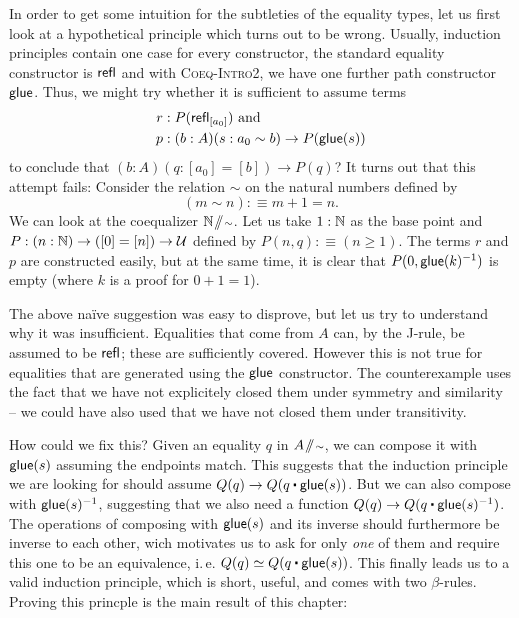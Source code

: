 In order to get some intuition for the subtleties of the equality types,
let us first look at a hypothetical principle which turns out to be wrong.
Usually, induction principles contain one case for every constructor,
the standard equality constructor is $\mathsf{refl}$ and with \textsc{Coeq-Intro2}, we
have one further path constructor $\mathsf{glue}$.
Thus, we might try whether it is sufficient to assume terms
\begin{align*}
r &: P(\mathsf{refl}_{[a_0]}) \text{ and}\\
p &: (b : A)(s : a_0 \sim b) \to P(\mathsf{glue}(s))
\end{align*}
to conclude that $(b : A)(q : [a_0] = [b]) \to P(q)$?
It turns out that this attempt fails:
Consider the relation $\sim$ on the natural numbers defined by
\begin{equation*}
(m \sim n) :\equiv m + 1 = n \text{.}
\end{equation*}
We can look at the coequalizer $\mathbb{N} \! \sslash \! {\scriptstyle \sim}$.
Let us take $1 : \mathbb{N}$ as the base point and $P : (n : \mathbb{N}) \to ([0] = [n]) \to \mathcal{U}$
defined by $P(n,q) :\equiv (n \geq 1)$.
The terms $r$ and $p$ are constructed easily, but at the same time, it is clear
that $P(0, \mathsf{glue}(k)^{-1})$ is empty (where $k$ is a proof for $0 + 1 = 1$).

The above naïve suggestion was easy to disprove, but let us try to understand
why it was insufficient.
Equalities that come from $A$ can, by the J-rule, be assumed to be $\mathsf{refl}$;
these are sufficiently covered.
However this is not true for equalities that are generated using the $\mathsf{glue}$ constructor.
The counterexample uses the fact that we have not explicitely closed them under symmetry
and similarity -- we could have also used that we have not closed them
under transitivity.

How could we fix this? Given an equality $q$ in $A \! \sslash \! {\scriptstyle \sim}$, we can compose it
with $\mathsf{glue}(s)$ assuming the endpoints match.
This suggests that the induction principle we are looking for should assume
$Q(q) \to Q(q \ct \glue(s))$.
But we can also compose with $\mathsf{glue}(s)^{-1}$,
suggesting that we also need a function $Q(q)  \to Q(q \ct \glue(s)\inv)$.
The operations of composing with $\mathsf{glue}(s)$ and its inverse should furthermore
be inverse to each other,
wich motivates us to ask for only \emph{one} of them and require this one to be
an equivalence, i.\,e. $Q(q) \simeq Q(q \ct \glue(s))$.
This finally leads us to a valid induction principle, which is short, useful, and
comes with two $\beta$-rules.
Proving this princple is the main result of this chapter:

